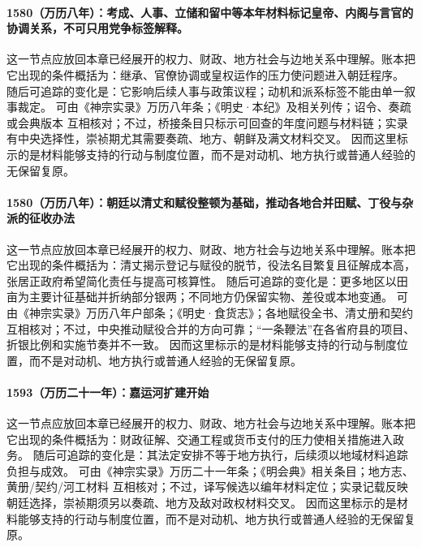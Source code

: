 \paragraph{1580（万历八年）：考成、人事、立储和留中等本年材料标记皇帝、内阁与言官的协调关系，不可只用党争标签解释。} 这一节点应放回本章已经展开的权力、财政、地方社会与边地关系中理解。账本把它出现的条件概括为：继承、官僚协调或皇权运作的压力使问题进入朝廷程序。 随后可追踪的变化是：它影响后续人事与政策议程；动机和派系标签不能由单一叙事裁定。 可由《神宗实录》万历八年条；《明史·本纪》及相关列传；诏令、奏疏或会典版本 互相核对；不过，桥接条目只标示可回查的年度问题与材料链；实录有中央选择性，崇祯期尤其需要奏疏、地方、朝鲜及满文材料交叉。 因而这里标示的是材料能够支持的行动与制度位置，而不是对动机、地方执行或普通人经验的无保留复原。

\paragraph{1580（万历八年）：朝廷以清丈和赋役整顿为基础，推动各地合并田赋、丁役与杂派的征收办法} 这一节点应放回本章已经展开的权力、财政、地方社会与边地关系中理解。账本把它出现的条件概括为：清丈揭示登记与赋役的脱节，役法名目繁复且征解成本高，张居正政府希望简化责任与提高可核算性。 随后可追踪的变化是：更多地区以田亩为主要计征基础并折纳部分银两；不同地方仍保留实物、差役或本地变通。 可由《神宗实录》万历八年户部条；《明史·食货志》；各地赋役全书、清丈册和契约 互相核对；不过，中央推动赋役合并的方向可靠；“一条鞭法”在各省府县的项目、折银比例和实施节奏并不一致。 因而这里标示的是材料能够支持的行动与制度位置，而不是对动机、地方执行或普通人经验的无保留复原。

\paragraph{1593（万历二十一年）：嘉运河扩建开始} 这一节点应放回本章已经展开的权力、财政、地方社会与边地关系中理解。账本把它出现的条件概括为：财政征解、交通工程或货币支付的压力使相关措施进入政务。 随后可追踪的变化是：其法定安排不等于地方执行，后续须以地域材料追踪负担与成效。 可由《神宗实录》万历二十一年条；《明会典》相关条目；地方志、黄册/契约/河工材料 互相核对；不过，译写候选以编年材料定位；实录记载反映朝廷选择，崇祯期须另以奏疏、地方及敌对政权材料交叉。 因而这里标示的是材料能够支持的行动与制度位置，而不是对动机、地方执行或普通人经验的无保留复原。

